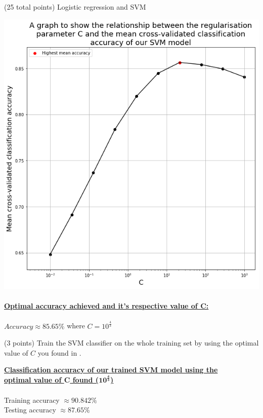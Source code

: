 \documentclass[12pt]{article}
\begin{document}
\begin{question}{(25 total points) Logistic regression and SVM}
\begin{subquestion}
      \begin{answerbox}{46em}
        \includegraphics[width=1\textwidth]{images/q25.png}
        \\
        \\
        \textbf{\underline{Optimal accuracy achieved and it's respective value of C:}} \\
        \\
        $Accuracy \approx 85.65 \%$  where  $C = 10^{\frac{4}{3}}$
      \end{answerbox}
  


   \end{subquestion}
   \begin{subquestion}{(3 points)
       Train the SVM classifier on the whole training set by using the
       optimal value of $C$ you found in . 
     } \label{Q2.6}


       

      \begin{answerbox}{10em}
        \large{\textbf{\underline{Classification accuracy of our trained SVM model using the}}} \\
        \large{\textbf{\underline{optimal value of $\mathbf{C}$ found ($\mathbf{10^{\frac{4}{3}}}$)}}}\\
        \\
        \normalsize{
        Training accuracy $\approx 90.842\%$\\
        Testing accuracy $\approx 87.65\%$
        }
      \end{answerbox}
  


   \end{subquestion}
%
%

\end{question}
\end{document}
